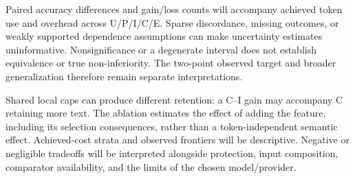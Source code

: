 \documentclass[conference]{IEEEtran}
\begin{document}
Paired accuracy differences and gain/loss counts will accompany achieved token use and overhead across U/P/I/C/E. Sparse discordance, missing outcomes, or weakly supported dependence assumptions can make uncertainty estimates uninformative. Nonsignificance or a degenerate interval does not establish equivalence or true non-inferiority. The two-point observed target and broader generalization therefore remain separate interpretations.

Shared local caps can produce different retention: a C--I gain may accompany C retaining more text. The ablation estimates the effect of adding the feature, including its selection consequences, rather than a token-independent semantic effect. Achieved-cost strata and observed frontiers will be descriptive. Negative or negligible tradeoffs will be interpreted alongside protection, input composition, comparator availability, and the limits of the chosen model/provider.
\end{document}
